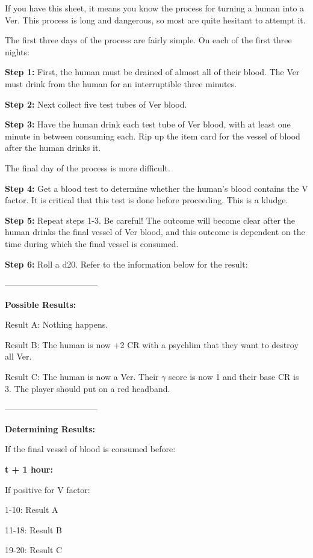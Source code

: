 \documentclass[green]{guildcamp4}
\begin{document}
\name{\gTurning{}}

If you have this sheet, it means you know the process for turning a human into a Ver. This process is long and dangerous, so most are quite hesitant to attempt it.

The first three days of the process are fairly simple. On each of the first three nights:

{\bf Step 1:} First, the human must be drained of almost all of their blood. The Ver must drink from the human for an interruptible three minutes. 

{\bf Step 2:} Next collect five test tubes of Ver blood.

{\bf Step 3:} Have the human drink each test tube of Ver blood, with at least one minute in between consuming each. Rip up the item card for the vessel of blood after the human drinks it.

The final day of the process is more difficult.

{\bf Step 4:} Get a blood test to determine whether the human's blood contains the V factor. It is critical that this test is done before proceeding. This is a kludge.

{\bf Step 5:} Repeat steps 1-3. Be careful! The outcome will become clear after the human drinks the final vessel of Ver blood, and this outcome is dependent on the time during which the final vessel is consumed.

{\bf Step 6:} Roll a d20. Refer to the information below for the result:

---------------------------------

{\bf Possible Results:}

Result A: Nothing happens.

Result B: The human is now +2 CR with a psychlim that they want to destroy all Ver.

Result C: The human is now a Ver. Their $\gamma$ score is now 1 and their base CR is 3. The player should put on a red headband.

---------------------------------

{\bf Determining Results:}

If the final vessel of blood is consumed before:

{\bf t + 1 hour:}

If positive for V factor:

1-10: Result A

11-18: Result B

19-20: Result C
\end{document}
